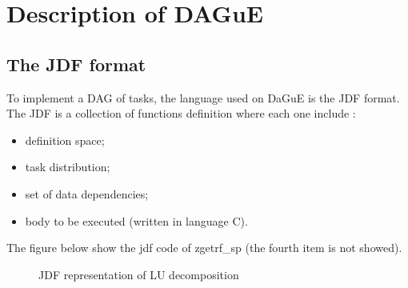 \documentclass{report}
\begin{document}
\section{Description of DAGuE}
\subsection{The JDF format}
To implement a DAG of tasks, the language used on DaGuE is the JDF format. The JDF is a collection of functions definition where each one include :
\begin{itemize}
\item definition space;
\item task distribution;
\item set of data dependencies;
\item body to be executed (written in language C).
\end{itemize}
The figure below show the jdf code of zgetrf\_sp (the fourth item is not showed).
\begin{figure}[!ht]
{\scriptsize} 
\caption{JDF representation of LU decomposition}
\end{figure}
\end{document}
